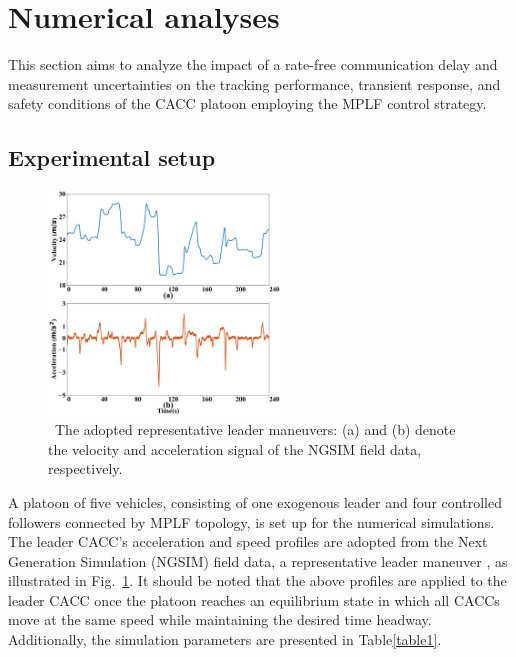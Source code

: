 \documentclass[a4paper]{cas-sc}
\begin{document}
\section{Numerical analyses}
\label{Section 5}

This section aims to analyze the impact of a rate-free communication delay and measurement uncertainties on the tracking performance, transient response, and safety conditions of the CACC platoon employing the MPLF control strategy.


\subsection{Experimental setup}


\begin{figure}
  \centering
  \includegraphics[width=0.55\textwidth]{figs/fig2.png}
  \caption
  {~The adopted representative leader maneuvers: (a) and (b) denote the velocity and acceleration signal of the NGSIM field data, respectively.} 
  \label{fig2}
\end{figure}

A platoon of five vehicles, consisting of one exogenous leader and four controlled followers connected by MPLF topology, is set up for the numerical simulations. The leader CACC's acceleration and speed profiles are adopted from the Next Generation Simulation (NGSIM) field data, a representative leader maneuver \citep{montanino2013making}, as illustrated in Fig.~\ref{fig2}. It should be noted that the above profiles are applied to the leader CACC once the platoon reaches an equilibrium state in which all CACCs move at the same speed while maintaining the desired time headway. Additionally, the simulation parameters are presented in Table\ref{table1}.
\end{document}
